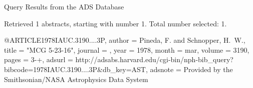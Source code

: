 Query Results from the ADS Database


Retrieved 1 abstracts, starting with number 1.  Total number selected: 1.

@ARTICLE{1978IAUC.3190....3P,
   author = {{Pineda}, F. and {Schnopper}, H.~W.},
    title = "{MCG 5-23-16}",
  journal = {\iaucirc},
     year = 1978,
    month = mar,
   volume = 3190,
    pages = {3-+},
   adsurl = {http://adsabs.harvard.edu/cgi-bin/nph-bib_query?bibcode=1978IAUC.3190....3P&db_key=AST},
  adsnote = {Provided by the Smithsonian/NASA Astrophysics Data System}
}


